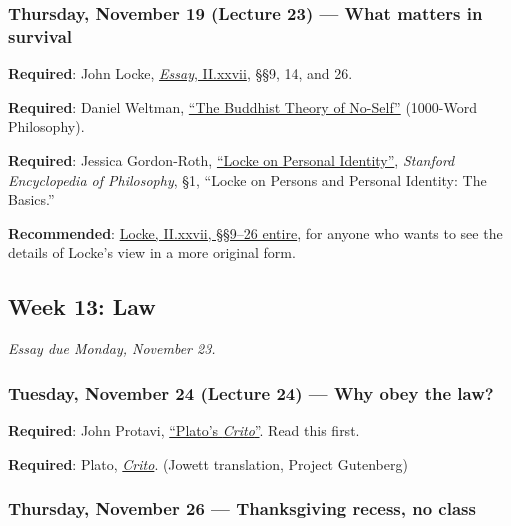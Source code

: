 \documentclass[
  letterpaper,
  DIV=11,
  numbers=noendperiod]{scrartcl}
\begin{document}
\subsubsection{Thursday, November 19 (Lecture 23) --- What matters in
survival}\label{thursday-november-19-lecture-23-what-matters-in-survival}

\textbf{Required}: John Locke,
\href{https://www.earlymoderntexts.com/assets/pdfs/locke1690book2_4.pdf}{\emph{Essay},
II.xxvii}, §§9, 14, and 26.

\textbf{Required}: Daniel Weltman,
\href{https://1000wordphilosophy.com/2023/02/25/no-self/}{``The Buddhist
Theory of No-Self''} (1000-Word Philosophy).

\textbf{Required}: Jessica Gordon-Roth,
\href{https://plato.stanford.edu/entries/locke-personal-identity/}{``Locke
on Personal Identity''}, \emph{Stanford Encyclopedia of Philosophy}, §1,
``Locke on Persons and Personal Identity: The Basics.''

\textbf{Recommended}:
\href{https://www.earlymoderntexts.com/assets/pdfs/locke1690book2_4.pdf}{Locke,
II.xxvii, §§9--26 entire}, for anyone who wants to see the details of
Locke's view in a more original form.

\subsection{Week 13: Law}\label{week-13-law}

\emph{Essay due Monday, November 23.}

\subsubsection{Tuesday, November 24 (Lecture 24) --- Why obey the
law?}\label{tuesday-november-24-lecture-24-why-obey-the-law}

\textbf{Required}: John Protavi,
\href{https://www.protevi.com/john/FH/PDF/Crito.pdf}{``Plato's
\emph{Crito}''}. Read this first.

\textbf{Required}: Plato,
\href{https://www.gutenberg.org/files/1657/1657-h/1657-h.htm}{\emph{Crito}}.
(Jowett translation, Project Gutenberg)

\subsubsection{Thursday, November 26 --- Thanksgiving recess, no
class}\label{thursday-november-26-thanksgiving-recess-no-class}
\end{document}
